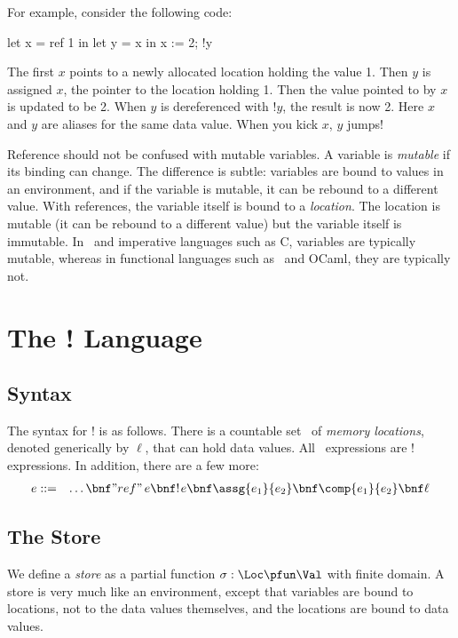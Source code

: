 For example, consider the following code:
\begin{code}
   let x = ref 1 in
   let y = x in
   x := 2; !y
\end{code}
The first $x$ points to a newly allocated location holding the value 1.  Then $y$ is assigned $x$, the pointer to the location holding 1.  Then the value pointed to by $x$ is updated to be 2.  When $y$ is dereferenced with $!y$, the result is now 2.  Here $x$ and $y$ are aliases for the same data value.  When you kick $x$, $y$ jumps!

Reference should not be confused with mutable variables. A variable is \emph{mutable} if its
binding can change. The difference is subtle: variables are bound to values in an environment,
and if the variable is mutable, it can be rebound to a different value. With references, the variable
itself is bound to a \emph{location}. The location is mutable (it can be rebound to a different value)
but the variable itself is immutable.
In \IMP\ and imperative languages such as C, variables are typically mutable, whereas in functional
languages such as \FL\ and OCaml, they are typically not.

\section{The \FL! Language}

\subsection{Syntax}
The syntax for \FL! is as follows.  There is a countable set \Loc\ of \emph{memory locations}, denoted generically by $\ell$, that can hold data values.  All \FL\ expressions are \FL! expressions.  In addition, there are a few more:
\begin{eqnarray*}
e &::=& \ldots \bnf "ref"\,e \bnf !\kern1pte \bnf \assg{e_1}{e_2} \bnf \comp{e_1}{e_2} \bnf \ell
\end{eqnarray*}

\subsection{The Store}

We define a \emph{store} as a partial function $\sigma: \Loc\pfun\Val$
with finite domain.  A store is very much like an environment, except
that variables are bound to locations, not to the data values
themselves, and the locations are bound to data values.

